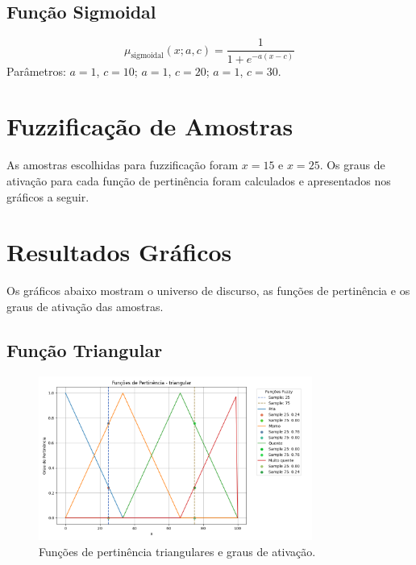 \documentclass[a4paper,12pt]{article}
\begin{document}
\subsection{Função Sigmoidal}
\[
\mu_{\text{sigmoidal}}(x; a, c) = \frac{1}{1 + e^{-a(x - c)}}
\]
Parâmetros: $a = 1$, $c = 10$; $a = 1$, $c = 20$; $a = 1$, $c = 30$.

\section{Fuzzificação de Amostras}
As amostras escolhidas para fuzzificação foram $x = 15$ e $x = 25$. Os graus de ativação para cada função de pertinência foram calculados e apresentados nos gráficos a seguir.

\section{Resultados Gráficos}
Os gráficos abaixo mostram o universo de discurso, as funções de pertinência e os graus de ativação das amostras.

\subsection{Função Triangular}
\begin{figure}[H]
    \centering
    \includegraphics[width=0.8\textwidth]{img/funções_de_pertinência_triangular_fuzzificado.png}
    \caption{Funções de pertinência triangulares e graus de ativação.}
\end{figure}
\end{document}
